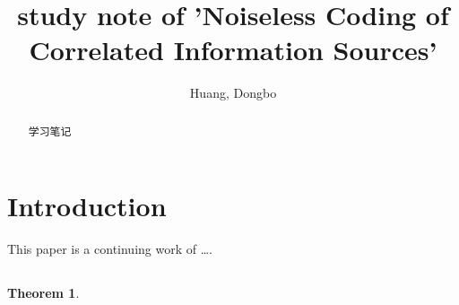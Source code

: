\documentclass[conference]{IEEEtran}
\title{study note of 'Noiseless Coding of Correlated Information Sources'}
\author{Huang, Dongbo}
\begin{document}
\theoremstyle{plain} \newtheorem{theorem}{Theorem}
\maketitle
\begin{abstract}  
学习笔记 
\end{abstract}  

\section{Introduction}
This paper is a continuing work of \ldots.


\subsection{}

\begin{theorem}

\end{theorem}
\end{document}
